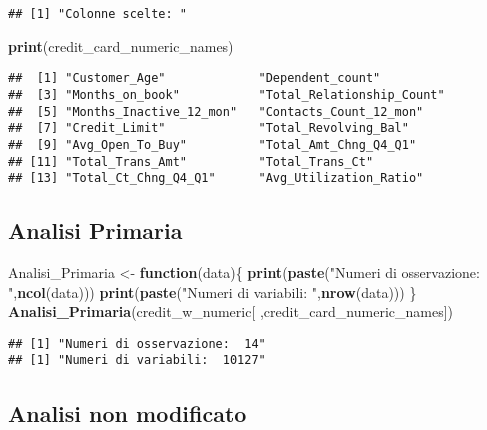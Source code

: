 \documentclass[
]{article}
\newenvironment{Shaded}{\begin{snugshade}}{\end{snugshade}}
\newcommand{\ControlFlowTok}[1]{\textcolor[rgb]{0.13,0.29,0.53}{\textbf{#1}}}
\newcommand{\FunctionTok}[1]{\textcolor[rgb]{0.13,0.29,0.53}{\textbf{#1}}}
\newcommand{\NormalTok}[1]{#1}
\newcommand{\OtherTok}[1]{\textcolor[rgb]{0.56,0.35,0.01}{#1}}
\newcommand{\StringTok}[1]{\textcolor[rgb]{0.31,0.60,0.02}{#1}}
\begin{document}
\begin{verbatim}
## [1] "Colonne scelte: "
\end{verbatim}

\begin{Shaded}
\begin{Highlighting}[]
\FunctionTok{print}\NormalTok{(credit\_card\_numeric\_names)}
\end{Highlighting}
\end{Shaded}

\begin{verbatim}
##  [1] "Customer_Age"             "Dependent_count"         
##  [3] "Months_on_book"           "Total_Relationship_Count"
##  [5] "Months_Inactive_12_mon"   "Contacts_Count_12_mon"   
##  [7] "Credit_Limit"             "Total_Revolving_Bal"     
##  [9] "Avg_Open_To_Buy"          "Total_Amt_Chng_Q4_Q1"    
## [11] "Total_Trans_Amt"          "Total_Trans_Ct"          
## [13] "Total_Ct_Chng_Q4_Q1"      "Avg_Utilization_Ratio"
\end{verbatim}

\subsection{Analisi Primaria}\label{analisi-primaria-1}

\begin{Shaded}
\begin{Highlighting}[]
\NormalTok{Analisi\_Primaria }\OtherTok{\textless{}{-}} \ControlFlowTok{function}\NormalTok{(data)\{}
  \FunctionTok{print}\NormalTok{(}\FunctionTok{paste}\NormalTok{(}\StringTok{"Numeri di osservazione: "}\NormalTok{,}\FunctionTok{ncol}\NormalTok{(data)))}
  \FunctionTok{print}\NormalTok{(}\FunctionTok{paste}\NormalTok{(}\StringTok{"Numeri di variabili: "}\NormalTok{,}\FunctionTok{nrow}\NormalTok{(data)))}
\NormalTok{\}}
\FunctionTok{Analisi\_Primaria}\NormalTok{(credit\_w\_numeric[ ,credit\_card\_numeric\_names])}
\end{Highlighting}
\end{Shaded}

\begin{verbatim}
## [1] "Numeri di osservazione:  14"
## [1] "Numeri di variabili:  10127"
\end{verbatim}

\subsection{Analisi non modificato}\label{analisi-non-modificato-1}
\end{document}
